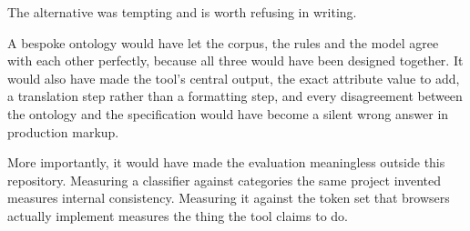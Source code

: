 The alternative was tempting and is worth refusing in writing.

A bespoke ontology would have let the corpus, the rules and the model agree with
each other perfectly, because all three would have been designed together. It
would also have made the tool's central output, the exact attribute value to
add, a translation step rather than a formatting step, and every disagreement
between the ontology and the specification would have become a silent wrong
answer in production markup.

More importantly, it would have made the evaluation meaningless outside this
repository. Measuring a classifier against categories the same project invented
measures internal consistency. Measuring it against the token set that browsers
actually implement measures the thing the tool claims to do.
